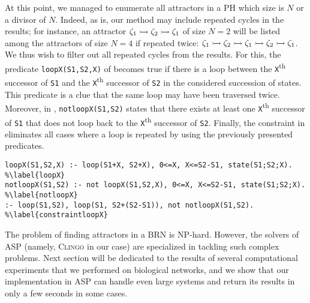 At this point, we managed to enumerate all attractors in a PH
which size is $N$ or a divisor of $N$.
Indeed, as is, our method may include repeated cycles in the results;
for instance, an attractor
$\zeta_1 \rightarrowtail \zeta_2 \rightarrowtail \zeta_1$ of size $N=2$
will be listed among the
attractors of size $N=4$ if repeated twice:
$\zeta_1 \rightarrowtail \zeta_2 \rightarrowtail \zeta_1 \rightarrowtail \zeta_2 \rightarrowtail \zeta_1$.
We thus wish to filter out all repeated cycles from the results.
For this, the predicate \texttt{loopX(S1,S2,X)} of  becomes true if there is a loop between
the \texttt{X}\textsuperscript{th} successor of \texttt{S1}
and the \texttt{X}\textsuperscript{th} successor of \texttt{S2}
in the considered succession of states.
This predicate is a clue that the same loop may have been traversed twice.
Moreover, in , \texttt{notloopX(S1,S2)} states that there exists at least one \texttt{X}\textsuperscript{th} successor of \texttt{S1} that does not loop back to the \texttt{X}\textsuperscript{th} successor of \texttt{S2}.
Finally, the constraint in  eliminates all cases where a loop is repeated by using the previously presented predicates.
\begin{lstlisting}
loopX(S1,S2,X) :- loop(S1+X, S2+X), 0<=X, X<=S2-S1, state(S1;S2;X). %\label{loopX}
notloopX(S1,S2) :- not loopX(S1,S2,X), 0<=X, X<=S2-S1, state(S1;S2;X). %\label{notloopX}
:- loop(S1,S2), loop(S1, S2+(S2-S1)), not notloopX(S1,S2). %\label{constraintloopX}
\end{lstlisting}

The problem of finding attractors in a BRN is NP-hard.
However, the solvers of ASP (namely, \textsc{Clingo} in our case)
are specialized in tackling such complex problems.
Next section will be dedicated to the results
of several computational experiments that we performed on biological networks,
and we show that our implementation in ASP can handle
even large systems and return its results in only a few seconds in some cases.



%
%
